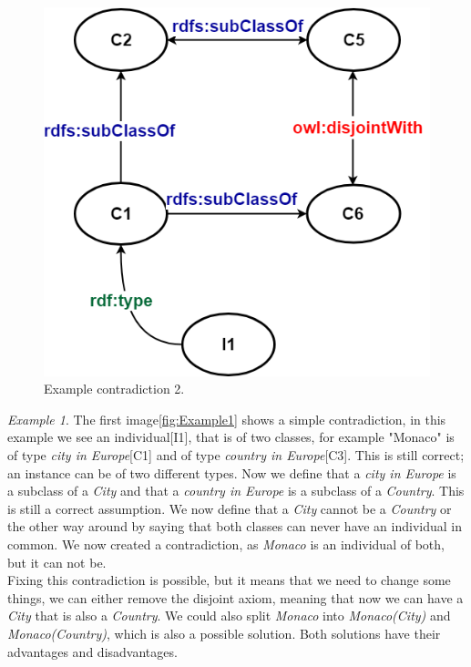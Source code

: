 \documentclass[11pt,letterpaper ,oneside ]{book}
\begin{document}
	\begin{figure}
		\centering
		\includegraphics[width=\linewidth]{images/Example2.png}
		\caption{Example contradiction 2.}
		\label{fig:Example2}
	\end{figure}
	
	\textit{Example 1}. The first image\ref{fig:Example1} shows a simple contradiction, in this example we see an individual[I1], that is of two classes, for example "Monaco" is of type \textit{city in Europe}[C1] and of type \textit{country in Europe}[C3]. This is still correct; an instance can be of two different types. Now we define that a \textit{city in Europe} is a subclass of a \textit{City} and that a \textit{country in Europe} is a subclass of a \textit{Country}. This is still a correct assumption. We now define that a \textit{City} cannot be a \textit{Country} or the other way around by saying that both classes can never have an individual in common. We now created a contradiction, as \textit{Monaco} is an individual of both, but it can not be.\\
	
	Fixing this contradiction is possible, but it means that we need to change some things, we can either remove the disjoint axiom, meaning that now we can have a \textit{City} that is also a \textit{Country}. We could also split \textit{Monaco} into \textit{Monaco(City)} and \textit{Monaco(Country)}, which is also a possible solution. Both solutions have their advantages and disadvantages.\\
	
\end{document}
